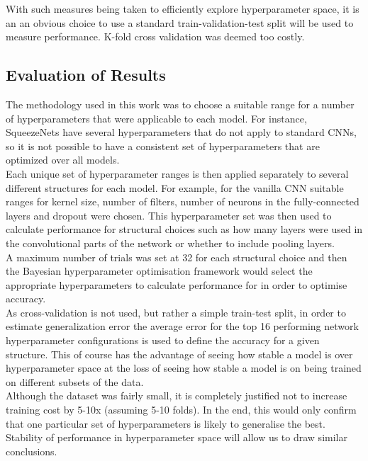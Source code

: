 \documentclass{article}
\begin{document}
 With such measures being taken to efficiently explore hyperparameter space, it is an an obvious choice to use a standard train-validation-test split will be used to measure performance. K-fold cross validation was deemed too costly.\\




\subsection*{Evaluation of Results}
The methodology used in this work was to choose a suitable range for a number of hyperparameters that were applicable to each model. For instance, SqueezeNets have several hyperparameters that do not apply to standard CNNs, so it is not possible to have a consistent set of hyperparameters that are optimized over all  models. \\

Each unique set of hyperparameter ranges is then applied separately to several different structures for each model. For example, for the vanilla CNN suitable ranges for kernel size, number of filters, number of neurons in the fully-connected layers and dropout were chosen. This hyperparameter set was then used to calculate performance for structural choices such as how many layers were used in the convolutional parts of the network or whether to include pooling layers. \\

A maximum number of trials was set at 32 for each structural choice and then the Bayesian hyperparameter optimisation framework would select the appropriate hyperparameters to calculate performance for in order to optimise accuracy. \\

As cross-validation is not used, but rather a simple train-test split, in order to estimate generalization error the average error for the top 16 performing network hyperparameter configurations is used to define the accuracy for a given structure. This of course has the advantage of seeing how stable a model is over hyperparameter space at the loss of seeing how stable a model is on being trained on different subsets of the data.\\

Although the dataset was fairly small, it is completely justified not to increase training cost by 5-10x (assuming 5-10 folds). In the end, this would only confirm that one particular set of hyperparameters is likely to generalise the best. Stability of performance in hyperparameter space will allow us to draw similar conclusions.\\
\end{document}
